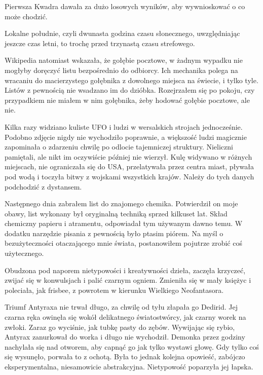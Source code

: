 Pierwsza Kwadra dawała za dużo losowych wyników, aby wywnioskować o co może chodzić.

Lokalne południe, czyli dwunasta godzina czasu słonecznego, uwzględniając jeszcze czas letni, to trochę przed trzynastą czasu strefowego.

Wikipedia natomiast wskazała, że gołębie pocztowe, w żadnym wypadku nie mogłyby doręczyć listu bezpośrednio do odbiorcy.
Ich mechanika polega na wracaniu do macierzystego gołębnika z dowolnego miejsca na świecie, i tylko tyle.
Listów z pewnością nie wsadzano im do dzióbka.
Rozejrzałem się po pokoju, czy przypadkiem nie miałem w nim gołębnika, żeby hodować gołębie pocztowe, ale nie.

Kilka razy widziano kuliste UFO i ludzi w wersalskich strojach jednocześnie.
Podobno zdjęcie nigdy nie wychodziło poprawnie, a większość ludzi
magicznie zapominała o zdarzeniu chwilę po odlocie tajemniczej struktury.
Nieliczni pamiętali, ale nikt im oczywiście później nie wierzył.
Kulę widywano w różnych miejscach, nie ograniczała się do USA, przelatywała przez centra miast, pływała pod wodą
i toczyła bitwy z wojskami wszystkich krajów. Należy do tych danych podchodzić z dystansem.

Następnego dnia zabrałem list do znajomego chemika. 
Potwierdził on moje obawy, list wykonany był oryginalną techniką sprzed kilkuset lat.
Skład chemiczny papieru i atramentu, odpowiadał tym używanym dawno temu.
W dodatku narzędzie pisania z pewnością było ptasim piórem.
Na myśl o bezużyteczności otaczającego mnie świata, postanowiłem pojutrze zrobić coś użytecznego.

\divider{}

Obudzona pod naporem nietypowości i kreatywności dzieła, zaczęła krzyczeć, zwijać się w konwulsjach i palić czarnym ogniem.
Zmieniła się w mały księżyc i poleciała, jak frisbee, z powrotem w kierunku Wielkiego Neofantasora.

Triumf Antyraxa nie trwał długo, za chwilę od tyłu złapała go Dedirid.
Jej czarna ręka owinęła się wokół delikatnego światostwórcy, jak czarny worek na zwłoki.
Zaraz go wyciśnie, jak tubkę pasty do zębów.
Wywijając się rybio, Antyrax zanurkował do worka i długo nie wychodził.
Demonka przez godziny nachylała się nad otworem, aby capnąć go jak tylko wystawi głowę.
Gdy tylko coś się wysunęło, porwała to z ochotą.
Była to jednak kolejna opowieść, zabójczo eksperymentalna, niesamowicie abstrakcyjna.
Nietypowość poparzyła jej łapska.

\divider{}

